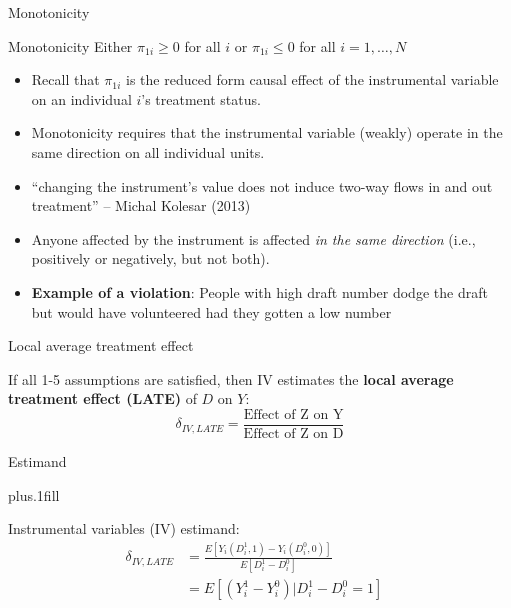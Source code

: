 \documentclass{beamer}
\begin{document}
\begin{frame}{Monotonicity}
	
	\begin{block}{Monotonicity}
	Either $\pi_{1i}\geq{0}$ for all $i$ or $\pi_{1i}\leq{0}$ for all $i=1, \dots, N$
	\end{block}

\begin{itemize}

\item Recall that $\pi_{1i}$ is the reduced form causal effect of the instrumental variable on an individual $i$'s treatment status.  
\item Monotonicity requires that the instrumental variable (weakly) operate in the same direction on all individual units.  
\item ``changing the instrument's value does not induce two-way flows in and out treatment'' -- Michal Kolesar (2013)
\item Anyone affected by the instrument is affected \emph{in the same direction} (i.e., positively or negatively, but not both).
\item \textbf{Example of a violation}: People with high draft number dodge the draft but would have volunteered had they gotten a low number

\end{itemize}

\end{frame}


\begin{frame}{Local average treatment effect}

	If all 1-5 assumptions are satisfied, then IV estimates the \textbf{local average treatment effect (LATE)} of $D$ on $Y$: $$\delta_{IV,LATE} =\frac{\text{Effect of Z on Y}}{\text{Effect of Z on D}}$$

\end{frame}	

\begin{frame}{Estimand}

	\vskip3pt plus.1fill
				
	Instrumental variables (IV) estimand: 
	\begin{align*}
	\delta_{IV,LATE} & = \frac{E[Y_i(D^1_i, 1) - Y_i(D^0_i, 0)]}{E[D^1_i - D^0_i]}& \\
	& = E[(Y^1_i - Y^0_i) | D^1_i - D^0_i = 1]
	\end{align*}

\end{frame}		
\end{document}
